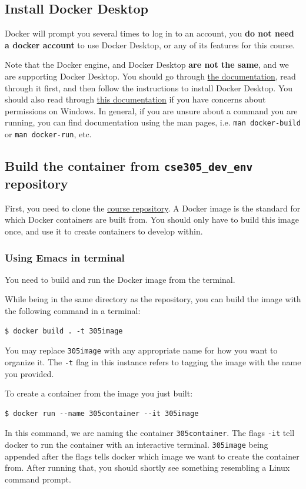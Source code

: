 \documentclass{extarticle}
\begin{document}
\subsection{Install Docker Desktop}
Docker will prompt you several times to log in to an account, you \textbf{do not need a docker account} to use Docker
Desktop, or any of its features for this course.

Note that the Docker engine, and Docker Desktop \textbf{are not the same}, and we are supporting Docker Desktop.
You should go through \href{https://docs.docker.com/desktop/setup/install/windows-install/}{the documentation},
read through it first, and then follow the instructions to install Docker Desktop. You should also read through
\href{https://docs.docker.com/desktop/setup/install/windows-permission-requirements/}{this documentation}
if you have concerns about permissions on Windows.
In general, if you are unsure about a command you are running, you can find documentation using the man
pages, i.e. \texttt{man docker-build} or \texttt{man docker-run}, etc.

\subsection{Build the container from \texttt{cse305\_dev\_env} repository}
First, you need to clone the \href{https://github.com/UB-CSE-305/cse305_dev_env}{course repository}.
A Docker image is the standard for which Docker containers are built from. You should only have to build
this image once, and use it to create containers to develop within.

\subsubsection{Using Emacs in terminal}
You need to build and run the Docker image from the terminal.

While being in the same directory as the repository, you can build the image with the following command in a
terminal:
\begin{lstlisting}
$ docker build . -t 305image
\end{lstlisting}
You may replace \texttt{305image} with any appropriate name for how you want to organize it.
The \texttt{-t} flag in this instance refers to tagging the image with the name you provided.

To create a container from the image you just built:
\begin{lstlisting}
$ docker run --name 305container --it 305image
\end{lstlisting}
In this command, we are naming the container \texttt{305container}. The flags \texttt{-it} tell docker to run the container
with an interactive terminal. \texttt{305image} being appended after the flags tells docker which image we want to create the container from.
After running that, you should shortly see something resembling a Linux command prompt.
\end{document}
